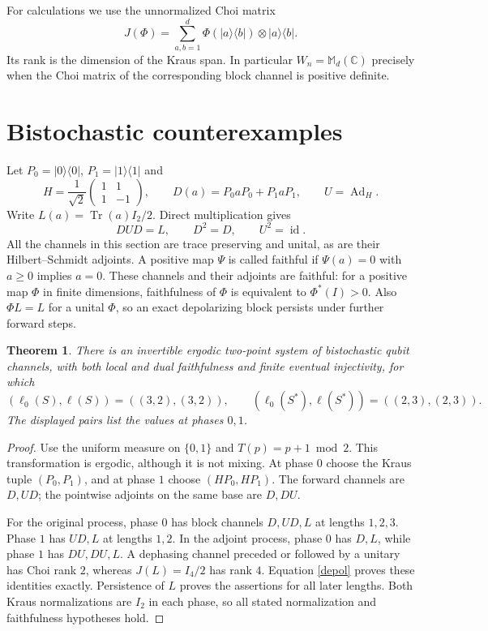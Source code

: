 \documentclass[11pt,a4paper]{article}
\newtheorem{theorem}{Theorem}
\newcommand{\M}{\mathbb M_d(\mathbb C)}
\newcommand{\Ad}{\operatorname{Ad}}
\newcommand{\tr}{\operatorname{Tr}}
\newcommand{\id}{\operatorname{id}}
\begin{document}
For calculations we use the unnormalized Choi matrix
\[
 J(\Phi)=\sum_{a,b=1}^d \Phi(|a\rangle\langle b|)\otimes|a\rangle\langle b|.
\]
Its rank is the dimension of the Kraus span. In particular $W_n=\M$ precisely when the Choi matrix of the corresponding block channel is positive definite.

\section{Bistochastic counterexamples}
Let $P_0=|0\rangle\langle0|$, $P_1=|1\rangle\langle1|$ and
\[
 H=\frac1{\sqrt2}\begin{pmatrix}1&1\\1&-1\end{pmatrix},\qquad
 D(a)=P_0aP_0+P_1aP_1,\qquad U=\Ad_H.
\]
Write $L(a)=\tr(a)I_2/2$. Direct multiplication gives
\begin{equation}\label{depol}
 DUD=L,\qquad D^2=D,\qquad U^2=\id.
\end{equation}
All the channels in this section are trace preserving and unital, as are their Hilbert--Schmidt adjoints. A positive map $\Psi$ is called faithful if $\Psi(a)=0$ with $a\geq0$ implies $a=0$. These channels and their adjoints are faithful: for a positive map $\Phi$ in finite dimensions, faithfulness of $\Phi$ is equivalent to $\Phi^*(I)>0$. Also $\Phi L=L$ for a unital $\Phi$, so an exact depolarizing block persists under further forward steps.

\begin{theorem}\label{two}
There is an invertible ergodic two-point system of bistochastic qubit channels, with both local and dual faithfulness and finite eventual injectivity, for which
\[
 (\ell_0(S),\ell(S))=((3,2),(3,2)),\qquad
 (\ell_0(S^*),\ell(S^*))=((2,3),(2,3)).
\]
The displayed pairs list the values at phases $0,1$.
\end{theorem}
\begin{proof}
Use the uniform measure on $\{0,1\}$ and $T(p)=p+1\bmod2$. This transformation is ergodic, although it is not mixing. At phase $0$ choose the Kraus tuple $(P_0,P_1)$, and at phase $1$ choose $(HP_0,HP_1)$. The forward channels are $D,UD$; the pointwise adjoints on the same base are $D,DU$.

For the original process, phase $0$ has block channels $D,UD,L$ at lengths $1,2,3$. Phase $1$ has $UD,L$ at lengths $1,2$. In the adjoint process, phase $0$ has $D,L$, while phase $1$ has $DU,DU,L$. A dephasing channel preceded or followed by a unitary has Choi rank $2$, whereas $J(L)=I_4/2$ has rank $4$. Equation \eqref{depol} proves these identities exactly. Persistence of $L$ proves the assertions for all later lengths. Both Kraus normalizations are $I_2$ in each phase, so all stated normalization and faithfulness hypotheses hold.
\end{proof}
\end{document}
